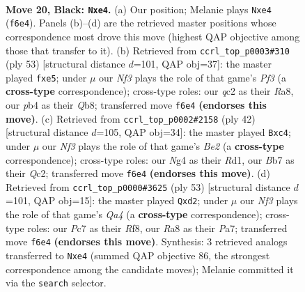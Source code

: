 \documentclass[11pt]{article}
\begin{document}
\clearpage

\begin{figure}[p]\centering
\begin{subfigure}{0.46\textwidth}\centering
\resizebox{\linewidth}{!}{%
\newchessgame
\chessboard[
  setfen={rq6/1bp2kpp/1b1p1n2/8/pP1NP1n1/2P5/P1Q2PPP/1RB1RK2 b - - 2 20},
  showmover=false,
  pgfstyle=straightmove, color=movearrow, markmove={f6-e4}
]}
\caption{}
\end{subfigure}\hfill
\begin{subfigure}{0.46\textwidth}\centering
\resizebox{\linewidth}{!}{%
\newchessgame
\chessboard[
  setfen={rq2rn1k/1bpnb1p1/5p1p/Np2P3/1P3P2/3B3P/N1P1QBPK/1R3R2 b - - 1 27},
  showmover=false,
  pgfstyle=straightmove, color=movearrow, markmove={f6-e5}
]}
\caption{}
\end{subfigure}
\\[4pt]
\begin{subfigure}{0.46\textwidth}\centering
\resizebox{\linewidth}{!}{%
\newchessgame
\chessboard[
  setfen={r3rbk1/3n1pp1/p1q4p/8/P1p4B/4PN2/1PQ1BPPP/3R2K1 w - - 0 22},
  showmover=false,
  pgfstyle=straightmove, color=movearrow, markmove={e2-c4}
]}
\caption{}
\end{subfigure}\hfill
\begin{subfigure}{0.46\textwidth}\centering
\resizebox{\linewidth}{!}{%
\newchessgame
\chessboard[
  setfen={5rk1/pp1b1n1p/4p1p1/q2pb1B1/3N3P/1P1R4/P2Q1PP1/4R1K1 b - - 2 27},
  showmover=false,
  pgfstyle=straightmove, color=movearrow, markmove={a5-d2}
]}
\caption{}
\end{subfigure}
\caption{\textbf{Move 20, Black: \texttt{Nxe4}.} (a) Our position; Melanie plays \texttt{Nxe4} (\texttt{f6e4}). Panels (b)--(d) are the retrieved master positions whose correspondence most drove this move (highest QAP objective among those that transfer to it). (b) Retrieved from \texttt{ccrl\_top\_p0003\#310} (ply 53) [structural distance $d$=101, QAP obj=37]: the master played \texttt{fxe5}; under $\mu$ our \emph{Nf3} plays the role of that game's \emph{Pf3} (a \textbf{cross-type} correspondence); cross-type roles: our \emph{q}c2 as their \emph{R}a8, our \emph{p}b4 as their \emph{Q}b8; transferred move \texttt{f6e4} \textbf{(endorses this move)}. (c) Retrieved from \texttt{ccrl\_top\_p0002\#2158} (ply 42) [structural distance $d$=105, QAP obj=34]: the master played \texttt{Bxc4}; under $\mu$ our \emph{Nf3} plays the role of that game's \emph{Be2} (a \textbf{cross-type} correspondence); cross-type roles: our \emph{N}g4 as their \emph{R}d1, our \emph{B}b7 as their \emph{Q}c2; transferred move \texttt{f6e4} \textbf{(endorses this move)}. (d) Retrieved from \texttt{ccrl\_top\_p0000\#3625} (ply 53) [structural distance $d$=101, QAP obj=15]: the master played \texttt{Qxd2}; under $\mu$ our \emph{Nf3} plays the role of that game's \emph{Qa4} (a \textbf{cross-type} correspondence); cross-type roles: our \emph{P}c7 as their \emph{R}f8, our \emph{R}a8 as their \emph{P}a7; transferred move \texttt{f6e4} \textbf{(endorses this move)}. Synthesis: 3 retrieved analogs transferred to \texttt{Nxe4} (summed QAP objective 86, the strongest correspondence among the candidate moves); Melanie committed it via the \texttt{search} selector.}
\label{fig:thought-m39}
\end{figure}
\end{document}
